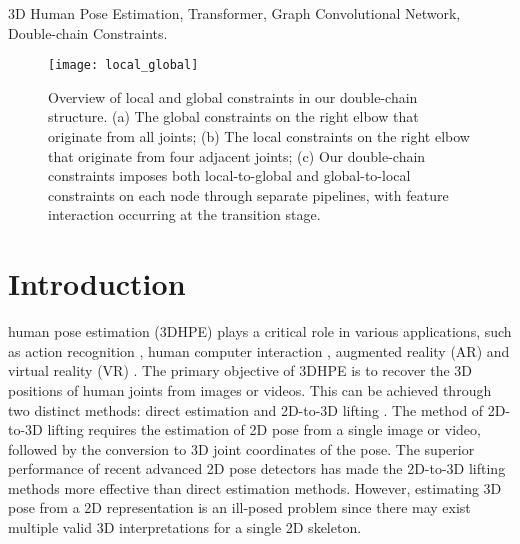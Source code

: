 \documentclass[journal]{IEEEtran}
\begin{document}
\begin{IEEEkeywords}
3D Human Pose Estimation, Transformer, Graph Convolutional Network, Double-chain Constraints.
\end{IEEEkeywords}

\begin{figure}[t]
\centering
\texttt{[image: local\_global]}
\caption{Overview of local and global constraints in our double-chain structure. (a) The global constraints on the right elbow that originate from all joints; (b) The local constraints on the right elbow that originate from four adjacent joints; (c) Our double-chain constraints imposes both local-to-global and global-to-local constraints on each node through separate pipelines, with feature interaction occurring at the transition stage.}
\label{fig:l_g}
\end{figure}


\section{Introduction}
 human pose estimation (3DHPE) plays a critical role in various applications, such as action recognition \cite{liu2017enhanced,liu2018recognizing,wang2018depth}, human computer interaction \cite{preece1994human}, augmented reality (AR) and virtual reality (VR) \cite{mehta2017vnect}. The primary objective of 3DHPE is to recover the 3D positions of human joints from images or videos. This can be achieved through two distinct methods: direct estimation\cite{zhou2016deep,lee2018propagating,chen2020towards} and 2D-to-3D lifting \cite{zhao2022graformer,pavllo20193d,cai2019exploiting,hu2021conditional}. The method of 2D-to-3D lifting requires the estimation of 2D pose from a single image or video, followed by the conversion to 3D joint coordinates of the pose. The superior performance of recent advanced 2D pose detectors \cite{chen2018cascaded,sun2019deep} has made the 2D-to-3D lifting methods more effective than direct estimation methods. However, estimating 3D pose from a 2D representation is an ill-posed problem since there may exist multiple valid 3D interpretations for a single 2D skeleton.
\end{document}
